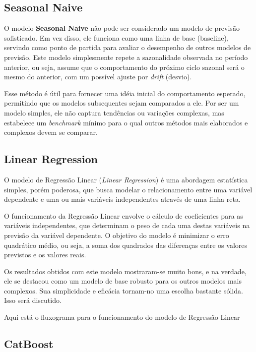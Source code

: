 \subsection{Seasonal Naive}

O modelo \textbf{Seasonal Naive} não pode ser considerado um modelo de previsão sofisticado. Em vez disso, ele funciona como uma linha de base (baseline), servindo como ponto de partida para avaliar o desempenho de outros modelos de previsão. Este modelo simplesmente repete a sazonalidade observada no período anterior, ou seja, assume que o comportamento do próximo ciclo sazonal será o mesmo do anterior, com um possível ajuste por \textit{drift} (desvio).

Esse método é útil para fornecer uma idéia inicial do comportamento esperado, permitindo que os modelos subsequentes sejam comparados a ele. Por ser um modelo simples, ele não captura tendências ou variações complexas, mas estabelece um \textit{benchmark} mínimo para o qual outros métodos mais elaborados e complexos devem se comparar.

\subsection{Linear Regression}

O modelo de Regressão Linear (\textit{Linear Regression}) é uma abordagem estatística simples, porém poderosa, que busca modelar o relacionamento entre uma variável dependente e uma ou mais variáveis independentes através de uma linha reta. 

O funcionamento da Regressão Linear envolve o cálculo de coeficientes para as variáveis independentes, que determinam o peso de cada uma destas variáveis na previsão da variável dependente. O objetivo do modelo é minimizar o erro quadrático médio, ou seja, a soma dos quadrados das diferenças entre os valores previstos e os valores reais.

Os resultados obtidos com este modelo mostraram-se muito bons, e na verdade, ele se destacou como um modelo de base robusto para os outros modelos mais complexos. Sua simplicidade e eficácia tornam-no uma escolha bastante sólida. Isso será discutido.

Aqui está o fluxograma para o funcionamento do modelo de Regressão Linear


\subsection{CatBoost}

